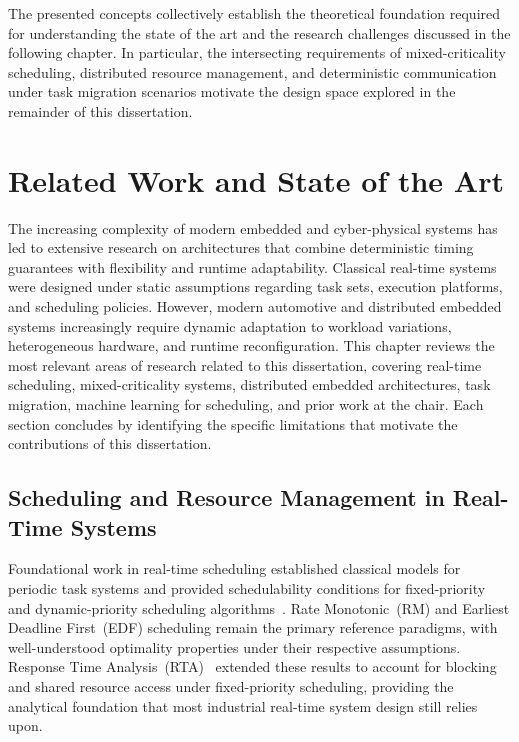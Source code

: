 The presented concepts collectively establish the theoretical
foundation required for understanding the state of the art
and the research challenges discussed in the following
chapter. In particular, the intersecting requirements of
mixed-criticality scheduling, distributed resource management,
and deterministic communication under task migration scenarios
motivate the design space explored in the remainder of this
dissertation.


\chapter{Related Work and State of the Art}
\label{chap:relatedwork}

The increasing complexity of modern embedded and cyber-physical systems has led to
extensive research on architectures that combine deterministic timing guarantees with
flexibility and runtime adaptability. Classical real-time systems were designed under
static assumptions regarding task sets, execution platforms, and scheduling policies.
However, modern automotive and distributed embedded systems increasingly require
dynamic adaptation to workload variations, heterogeneous hardware, and runtime
reconfiguration. This chapter reviews the most relevant areas of research related to
this dissertation, covering real-time scheduling, mixed-criticality systems, distributed
embedded architectures, task migration, machine learning for scheduling, and prior
work at the chair. Each section concludes by identifying the specific limitations that
motivate the contributions of this dissertation.

\section{Scheduling and Resource Management in Real-Time Systems}
\label{sec:rw_scheduling}

Foundational work in real-time scheduling established classical models for periodic
task systems and provided schedulability conditions for fixed-priority and
dynamic-priority scheduling algorithms~\cite{liu1973,buttazzo2011}. Rate Monotonic~(RM)
and Earliest Deadline First~(EDF) scheduling remain the primary reference paradigms,
with well-understood optimality properties under their respective assumptions. Response
Time Analysis~(RTA)~\cite{joseph1986} extended these results to account for blocking
and shared resource access under fixed-priority scheduling, providing the analytical
foundation that most industrial real-time system design still relies upon.

